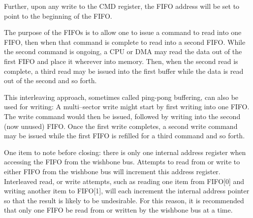 \documentclass{gqtekspec}
\begin{document}
\begin{table}
\begin{table}
\begin{table}
\begin{table}
Further, upon any write to the CMD register, the FIFO address will be set
to point to the beginning of the FIFO.

The purpose of the FIFOs is to allow one to issue a command to read into one
FIFO, then when that command is complete to read into a second FIFO.  While
the second command is ongoing, a CPU or DMA may read the data out of the first
FIFO and place it wherever into memory.  Then, when the second read is complete,
a third read may be issued into the first buffer while the data is read out of
the second and so forth.

This interleaving approach, sometimes called ping-pong buffering, can also be
used for writing: A multi--sector write might start by first writing into one
FIFO.  The write command would then be issued, followed by writing into the
second (now unused) FIFO.  Once the first write completes, a second write
command may be issued while the first FIFO is refilled for a third command
and so forth.

One item to note before closing: there is only one internal address register
when accessing the FIFO from the wishbone bus.  Attempts to read from or write
to either FIFO from the wishbone bus will increment this address register. 
Interleaved read, or write attempts, such as reading one item from
FIFO[0] and writing another item to FIFO[1], will each increment the internal
address pointer so that the result is likely to be undesirable.  For this
reason, it is recommended that only one FIFO be read from or written by the
wishbone bus at a time.

\end{table}
\end{table}
\end{table}
\end{table}
\end{document}
